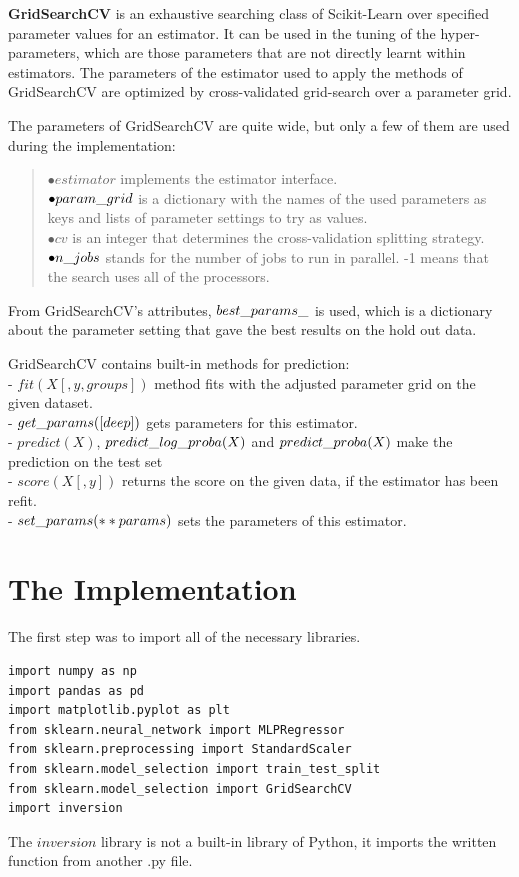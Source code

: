 \newpage

\textbf{GridSearchCV} \cite{jolly2018machine} is an exhaustive searching class of Scikit-Learn over specified parameter values for an estimator. It can be used in the tuning of the hyper-parameters, which are those parameters that are not directly learnt within estimators. The parameters of the estimator used to apply the methods of GridSearchCV are optimized by cross-validated grid-search over a parameter grid.\medskip

\noindent The parameters of GridSearchCV are quite wide, but only a few of them are used during the implementation:
\begin{verse}
	$\bullet estimator$ implements the estimator interface. \\
	$\bullet param\char`_grid$ is a dictionary with the names of the used parameters as keys and lists of parameter settings to try as values.\\
	$\bullet cv$ is an integer that determines the cross-validation splitting strategy.\\
	$\bullet n\char`_jobs$ stands for the number of jobs to run in parallel. -1 means that the search uses all of the processors. 
\end{verse}

From GridSearchCV's attributes, $best\char`_params\char`_$ is used, which is a dictionary about the parameter setting that gave the best results on the hold out data.\medskip

\noindent GridSearchCV contains built-in methods for prediction:\\
- $fit(X[, y, groups])$ method fits with the adjusted parameter grid on the given dataset.\\
- $get\char`_params([deep])$ gets parameters for this estimator.\\
- $predict(X)$, $predict\char`_log\char`_proba(X)$ and $predict\char`_proba(X)$ make the prediction on the test set\\
- $score(X[, y])$ returns the score on the given data, if the estimator has been refit.\\
- $set\char`_params(**params)$ sets the parameters of this estimator.\bigskip


\section{The Implementation}

The first step was to import all of the necessary libraries.
\begin{lstlisting}
import numpy as np
import pandas as pd
import matplotlib.pyplot as plt
from sklearn.neural_network import MLPRegressor
from sklearn.preprocessing import StandardScaler
from sklearn.model_selection import train_test_split
from sklearn.model_selection import GridSearchCV
import inversion
\end{lstlisting}
The $inversion$ library is not a built-in library of Python, it imports the written function from another .py file.\smallskip

